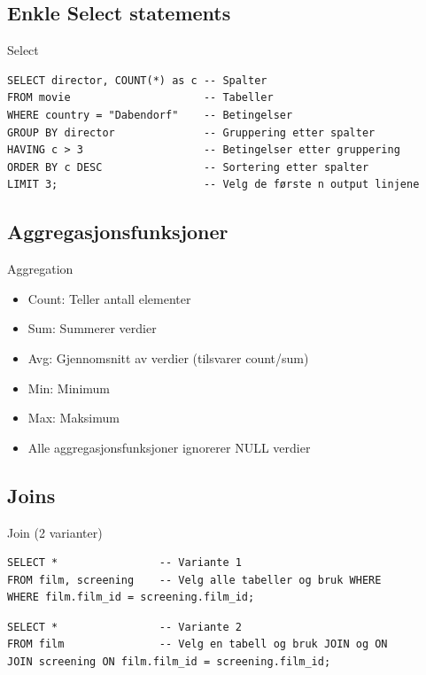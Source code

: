 \subsection*{Enkle Select statements}
\begin{frame}[fragile]{Select}
\begin{verbatim}
SELECT director, COUNT(*) as c -- Spalter
FROM movie                     -- Tabeller
WHERE country = "Dabendorf"    -- Betingelser
GROUP BY director              -- Gruppering etter spalter
HAVING c > 3                   -- Betingelser etter gruppering
ORDER BY c DESC                -- Sortering etter spalter 
LIMIT 3;                       -- Velg de første n output linjene
\end{verbatim}
\end{frame}

\subsection*{Aggregasjonsfunksjoner}
\begin{frame}[fragile]{Aggregation}
\begin{itemize}
    \item Count: Teller antall elementer
    \item Sum: Summerer verdier
    \item Avg: Gjennomsnitt av verdier (tilsvarer count/sum)
    \item Min: Minimum
    \item Max: Maksimum
    \item Alle aggregasjonsfunksjoner ignorerer NULL verdier
\end{itemize}
\end{frame}

\subsection*{Joins}
\begin{frame}[fragile]{Join (2 varianter)}
\begin{verbatim}
SELECT *                -- Variante 1
FROM film, screening    -- Velg alle tabeller og bruk WHERE
WHERE film.film_id = screening.film_id;
\end{verbatim}
\begin{verbatim}
SELECT *                -- Variante 2
FROM film               -- Velg en tabell og bruk JOIN og ON
JOIN screening ON film.film_id = screening.film_id;
\end{verbatim}
\end{frame}

